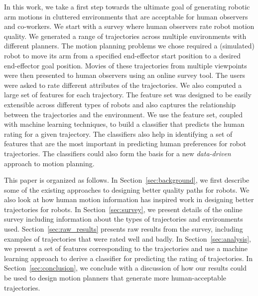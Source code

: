 \documentclass[letterpaper, 10 pt, conference]{ieeeconf}  %
\begin{document}
In this work, we take a first step towards the ultimate goal of generating robotic arm motions in cluttered environments that are acceptable for human observers and co-workers. We start with a survey where human observers rate robot motion quality. We generated a range of trajectories across multiple environments with different planners. The motion planning problems we chose required a (simulated) robot to move its arm from a specified end-effector start position to a desired end-effector goal position. Movies of these trajectories from multiple viewpoints were then presented to human observers using an online survey tool. The users were asked to rate different attributes of the trajectories. We also computed a large set of features for each trajectory. The feature set was designed to be easily extensible across different types of robots and also captures the relationship between the trajectories and the environment. We use the feature set, coupled with machine learning techniques, to build a classifier that predicts the human rating for a given trajectory. The classifiers also help in identifying a set of features that are the most important in predicting human preferences for robot trajectories. The classifiers could also form the basis for a new {\em data-driven} approach to motion planning. 

This paper is organized as follows. In Section~\ref{sec:background}, we first describe some of the existing approaches to designing better quality paths for robots. We also look at how human motion information has inspired work in designing better trajectories for robots. In Section~\ref{sec:survey}, we present details of the online survey including information about the types of trajectories and environments used. Section~\ref{sec:raw_results} presents raw results from the survey, including examples of trajectories that were rated well and badly. In Section~\ref{sec:analysis}, we present a set of features corresponding to the trajectories and use a machine learning approach to derive a classifier for predicting the rating of trajectories. In Section~\ref{sec:conclusion}, we conclude with a discussion of how our results could be used to design motion planners that generate more human-acceptable trajectories. 
\end{document}
